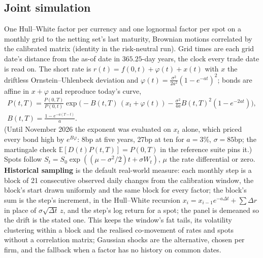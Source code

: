 \documentclass[11pt,a4paper]{article}
\let\plainsubsection\subsection
\renewcommand{\subsection}{\needspace{5\baselineskip}\plainsubsection}
\begin{document}
\subsection{Joint simulation}
One Hull--White factor per currency and one lognormal factor per spot on a monthly grid to the netting set's last maturity, Brownian motions correlated by the calibrated matrix (identity in the risk-neutral run). Grid times are each grid date's distance from the as-of date in $365.25$-day years, the clock every trade date is read on. The short rate is $r(t)=f(0,t)+\varphi(t)+x(t)$ with $x$ the driftless Ornstein--Uhlenbeck deviation and $\varphi(t)=\frac{\sigma^2}{2a^2}(1-e^{-at})^2$; bonds are affine in $x+\varphi$ and reproduce today's curve,
\begin{equation}
\begin{gathered}
P(t,T)=\frac{P(0,T)}{P(0,t)}\exp\!\Big(-B(t,T)\,(x_t+\varphi(t))-\frac{\sigma^2}{4a}B(t,T)^2(1-e^{-2at})\Big),\\
B(t,T)=\frac{1-e^{-a(T-t)}}{a}.
\end{gathered}
\end{equation}
(Until November 2026 the exponent was evaluated on $x_t$ alone, which priced every bond high by $e^{B\varphi}$: 8bp at five years, 27bp at ten for $a=3\%$, $\sigma=85$bp; the martingale check $\mathbb{E}[D(t)P(t,T)]=P(0,T)$ in the reference suite pins it.) Spots follow $S_t=S_0\exp((\mu-\sigma^2/2)t+\sigma W_t)$, $\mu$ the rate differential or zero. \textbf{Historical sampling} is the default real-world measure: each monthly step is a block of 21 consecutive observed daily changes from the calibration window, the block's start drawn uniformly and the same block for every factor; the block's sum is the step's increment, in the Hull--White recursion $x_i=x_{i-1}e^{-a\Delta t}+\sum\Delta r$ in place of $\sigma\sqrt{\Delta t}\,z$, and the step's log return for a spot; the panel is demeaned so the drift is the stated one. This keeps the window's fat tails, its volatility clustering within a block and the realised co-movement of rates and spots without a correlation matrix; Gaussian shocks are the alternative, chosen per firm, and the fallback when a factor has no history on common dates.
\end{document}

